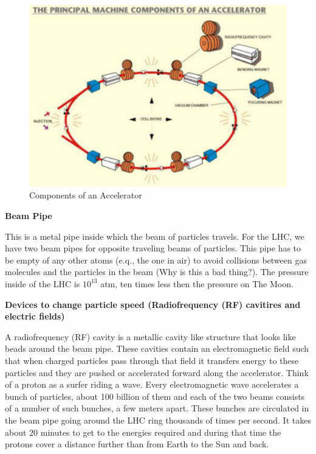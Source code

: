 \;
\;

\begin{figure}[h]
\centering\includegraphics[scale=0.5]{./Particleaccelerators/Pictures/fig2.pdf}
\caption{Components of an Accelerator}
\label{fig:pdgdedx}
\end{figure}

\;
\;
\;

\noindent
\textbf{Beam Pipe}

\;
\;

\noindent 
This is a metal pipe inside which the beam of particles travels. For the LHC, we have two beam pipes for opposite traveling beams of particles. This pipe has to be empty of any other atoms (e.q., the one in air) to avoid collisions between gas molecules and the particles in the beam (Why is this a bad thing?). The pressure inside of the LHC is $ 10^{13}$ atm, ten times less then the pressure on The Moon.

\;
\;
\;

\noindent
\textbf{Devices to change particle speed (Radiofrequency (RF) cavitires and electric fields)}

\;
\;

\noindent
A radiofrequency (RF) cavity is a metallic cavity like structure that looks like beads around the beam pipe.  These cavities contain an electromagnetic field such that when charged particles pass through that field it transfers energy to these particles and they are pushed or accelerated forward along the accelerator. Think of a proton as a surfer riding a wave.  Every electromagnetic wave accelerates a bunch of particles, about 100 billion of them and each of the two beams consists of a number of such bunches, a few meters apart. These bunches are circulated in the beam pipe going around the LHC ring thousands of times per second. It takes about 20 minutes to get to the energies required and during that time the protons cover a distance further than from Earth to the Sun and back.

